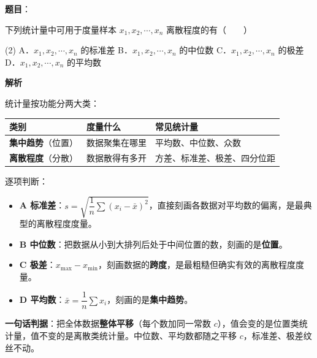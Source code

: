 \begin{answer}

\textbf{题目}：

下列统计量中可用于度量样本 $x_1,x_2,\cdots,x_n$ 离散程度的有\mbox{（　　）}

\begin{gkopts}(2)
\task A．$x_1,x_2,\cdots,x_n$ 的标准差
\task B．$x_1,x_2,\cdots,x_n$ 的中位数
\task C．$x_1,x_2,\cdots,x_n$ 的极差
\task D．$x_1,x_2,\cdots,x_n$ 的平均数
\end{gkopts}

\textbf{解析}

统计量按功能分两大类：

\begin{center}
\begin{tabular}{lll}
\toprule
类别 & 度量什么 & 常见统计量 \\
\midrule
\textbf{集中趋势}（位置） & 数据聚集在哪里 & 平均数、中位数、众数 \\
\textbf{离散程度}（分散） & 数据散得有多开 & 方差、标准差、极差、四分位距 \\
\bottomrule
\end{tabular}
\end{center}

逐项判断：

\begin{itemize}
\item \textbf{A  标准差}：$s=\sqrt{\dfrac1n\sum\left(x_i-\bar x\right)^{2}}$，直接刻画各数据对平均数的偏离，是最典型的离散程度度量。
\item \textbf{B  中位数}：把数据从小到大排列后处于中间位置的数，刻画的是\textbf{位置}。
\item \textbf{C  极差}：$x_{\max}-x_{\min}$，刻画数据的\textbf{跨度}，是最粗糙但确实有效的离散程度度量。
\item \textbf{D  平均数}：$\bar x=\dfrac1n\sum x_i$，刻画的是\textbf{集中趋势}。
\end{itemize}

\begin{gktip}
\textbf{一句话判据}：把全体数据\textbf{整体平移}（每个数加同一常数 $c$），值会变的是位置类统计量，值不变的是离散类统计量。中位数、平均数都随之平移 $c$，标准差、极差纹丝不动。
\end{gktip}


\par\medskip

\end{answer}
